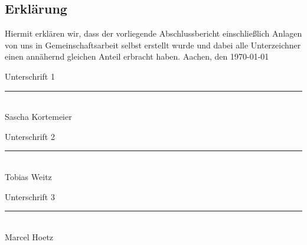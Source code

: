 \documentclass[a4paper, 12pt]{report}
\begin{document}
\begin{flushleft}
\chapter{Erklärung}
Hiermit erklären wir, dass der vorliegende Abschlussbericht einschließlich Anlagen von uns in Gemeinschaftsarbeit selbst erstellt wurde und dabei alle Unterzeichner einen annähernd gleichen Anteil erbracht haben.\newline \newline
Aachen, den \today
\newline \newline

Unterschrift 1
\newline \newline
\rule{5cm}{0.4pt}
\\
Sascha Kortemeier
\newline \newline \newline

Unterschrift 2
\newline \newline
\rule{5cm}{0.4pt}
\\
Tobias Weitz
\newline \newline \newline

Unterschrift 3
\newline \newline
\rule{5cm}{0.4pt}
\\
Marcel Hoetz

\end{flushleft}
\end{document}
